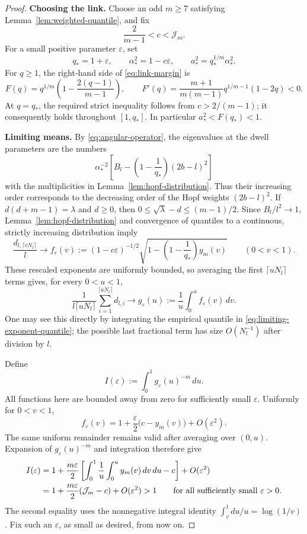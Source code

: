 \begin{proof}
\noindent\textbf{Choosing the link.}
Choose an odd $m\ge7$ satisfying Lemma~\ref{lem:weighted-quantile}, and
fix
\[
 \frac2{m-1}<c<\mathcal J_m.
\]
For a small positive parameter $\varepsilon$, set
\begin{equation}\label{eq:dwell-parameters}
 q_*=1+\varepsilon,
 \qquad \alpha_*^2=1-c\varepsilon,
 \qquad a_*^2=q_*^{1/m}\alpha_*^2.
\end{equation}
For $q\ge1$, the right-hand side of \eqref{eq:link-margin} is
\[
 F(q)=q^{1/m}\left(1-\frac{2(q-1)}{m-1}\right),
 \qquad
 F'(q)=\frac{m+1}{m(m-1)}q^{1/m-1}(1-2q)<0.
\]
At $q=q_*$, the required strict inequality follows from
$c>2/(m-1)$; it consequently holds throughout $[1,q_*]$.
In particular $a_*^2<F(q_*)<1$.

\medskip\noindent\textbf{Limiting means.}
By \eqref{eq:angular-operator}, the eigenvalues at the dwell parameters
are the numbers
\[
 \alpha_*^{-2}\left[B_l-
       \left(1-\frac1{q_*}\right)(2b-l)^2\right]
\]
with the multiplicities in Lemma~\ref{lem:hopf-distribution}.
Thus their increasing order corresponds to the decreasing order of the
Hopf weights $(2b-l)^2$.
If $d(d+m-1)=\lambda$ and $d\ge0$, then
$0\le\sqrt\lambda-d\le(m-1)/2$.
Since $B_l/l^2\to1$, Lemma~\ref{lem:hopf-distribution} and convergence
of quantiles to a continuous, strictly increasing distribution imply
\begin{equation}\label{eq:limiting-exponent-quantile}
 \frac{d_{l,\lceil vN_l\rceil}}{l}\longrightarrow
 f_\varepsilon(v):=(1-c\varepsilon)^{-1/2}
 \sqrt{1-\left(1-\frac1{q_*}\right)y_m(v)}
 \qquad(0<v<1).
\end{equation}
These rescaled exponents are uniformly bounded, so averaging the first
$\lceil uN_l\rceil$ terms gives, for every $0<u<1$,
\begin{equation}\label{eq:limiting-mean-exponents}
 \frac1{l\lceil uN_l\rceil}
       \sum_{i=1}^{\lceil uN_l\rceil}d_{l,i}
 \longrightarrow
 g_\varepsilon(u):=\frac1u\int_0^u f_\varepsilon(v)\,dv.
\end{equation}
One may see this directly by integrating the empirical quantile in
\eqref{eq:limiting-exponent-quantile}; the possible last fractional term
has size $O(N_l^{-1})$ after division by $l$.

Define
\[
 I(\varepsilon):=\int_0^1 g_\varepsilon(u)^{-m}\,du.
\]
All functions here are bounded away from zero for sufficiently small
$\varepsilon$. Uniformly for $0<v<1$,
\[
 f_\varepsilon(v)
 =1+\frac\varepsilon2\bigl(c-y_m(v)\bigr)+O(\varepsilon^2).
\]
The same uniform remainder remains valid after averaging over $(0,u)$.
Expansion of $g_\varepsilon(u)^{-m}$ and integration therefore give
\begin{align}
 I(\varepsilon)
 &=1+\frac{m\varepsilon}{2}
   \left[\int_0^1\frac1u\int_0^u y_m(v)\,dv\,du-c\right]
   +O(\varepsilon^2)\notag\\
 &=1+\frac{m\varepsilon}{2}(\mathcal J_m-c)
   +O(\varepsilon^2)>1
 \qquad\text{for all sufficiently small }\varepsilon>0.
 \label{eq:counting-first-variation}
\end{align}
The second equality uses the nonnegative integral identity
$\int_v^1du/u=\log(1/v)$.
Fix such an $\varepsilon$, as small as desired, from now on.


\end{proof}
